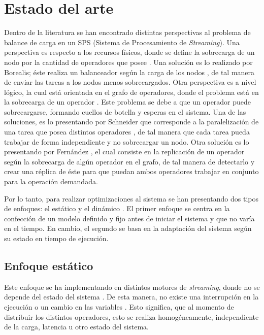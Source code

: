 \chapter{Estado del arte}
\label{cap:estado_del_arte}

Dentro de la literatura se han encontrado distintas perspectivas al problema de balance de carga en un SPS (Sistema de Procesamiento de \textsl{Streaming}). Una perspectiva es respecto a los recursos físicos, donde se define la sobrecarga de un nodo por la cantidad de operadores que posee \cite{MadsenTZ14}. Una solución es lo realizado por Borealis; éste realiza un balanceador según la carga de los nodos \cite{XingZH05}, de tal manera de enviar las tareas a los nodos menos sobrecargados. Otra perspectiva es a nivel lógico, la cual está orientada en el grafo de operadores, donde el problema está en la sobrecarga de un operador \cite{FernandezMKP13}. Este problema se debe a que un operador puede sobrecargarse, formando cuellos de botella y  esperas en el sistema. Una de las soluciones, es lo presentando por Schneider que corresponde a la paralelización de una tarea que posea distintos operadores \cite{SchneiderAGBW09}, de tal manera que cada tarea pueda trabajar de forma independiente y no sobrecargar un nodo. Otra solución es lo presentando por Fernández \cite{FernandezMKP13}, el cual consiste en la replicación de un operador según la sobrecarga de algún operador en el grafo, de tal manera de detectarlo y crear una réplica de éste para que puedan ambos operadores trabajar en conjunto para la operación demandada.

Por lo tanto, para realizar optimizaciones al sistema se han presentando dos tipos de enfoques: el estático y el dinámico \cite{Dong06schedulingalgorithms}. El primer enfoque se centra en la confección de un modelo definido y fijo antes de iniciar el sistema y que no varía en el tiempo. En cambio, el segundo se basa en la adaptación del sistema según su estado en tiempo de ejecución.

\section{Enfoque estático}

Este enfoque se ha implementando en distintos motores de \textsl{streaming}, donde no se depende del estado del sistema \cite{stormtwitter, s4}. De esta manera, no existe una interrupción en la ejecución o un cambio en las variables  \cite{CasavantK88}. Esto significa, que al momento de distribuir los distintos operadores, esto se realiza homogéneamente, independiente de la carga, latencia u otro estado del sistema.

